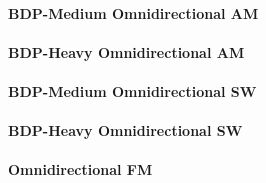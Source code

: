 
\paragraph{BDP-Medium Omnidirectional AM}
\label{loc:ExtIF_Omni_AM_Medium}



\paragraph{BDP-Heavy Omnidirectional AM}
\label{loc:ExtIF_Omni_AM_Heavy}




\paragraph{BDP-Medium Omnidirectional SW}
\label{loc:ExtIF_Omni_SW_Medium}



\paragraph{BDP-Heavy Omnidirectional SW}
\label{loc:ExtIF_Omni_SW_Heavy}




\paragraph{Omnidirectional FM}
\label{loc:ExtIF_Omni_FM}

